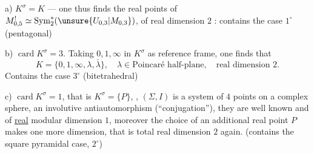 a) \(K^\sigma=K\) --- one thus finds the real points of \(M_{0,5}^{!}\simeq\mathrm{Sym}_2^*(\unsure{U_{0,3}|M_{0,3}})\),
 of real dimension \(2\) : contains the case \(1^\circ\) (pentagonal)

b) \(\operatorname{card}K^\sigma=3\). Taking \(0,1,\infty\) in \(K^\sigma\) as reference frame, one finds that
\[
K=\{0,1,\infty,\lambda,\bar\lambda\},\quad
\lambda\in\text{Poincaré half-plane},\quad\text{real dimension }2.
\]
Contains the case \(3^\circ\) (bitetrahedral)

c) \(\operatorname{card}K^\sigma=1\), that is  \(K^\sigma=\{P\}\), , 
\((\Sigma,I)\) is a system of \(4\) points on a complex sphere,   an involutive antiautomorphism \deleted{\(\unsure{\sigma}\)} (``conjugation''), they are well known and of \uline{real} modular dimension \(1\), moreover the choice of an additional real point \(P\) makes one more dimension, that is total real dimension \(2\) again.
(contains the square pyramidal case, \(2^\circ\))


